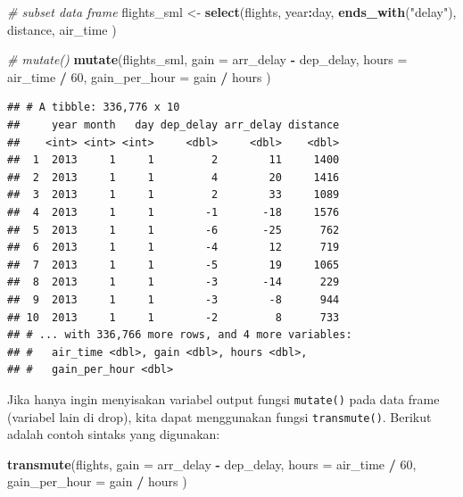 \documentclass[]{book}
\newenvironment{Shaded}{\begin{snugshade}}{\end{snugshade}}
\newcommand{\KeywordTok}[1]{\textcolor[rgb]{0.13,0.29,0.53}{\textbf{#1}}}
\newcommand{\DataTypeTok}[1]{\textcolor[rgb]{0.13,0.29,0.53}{#1}}
\newcommand{\DecValTok}[1]{\textcolor[rgb]{0.00,0.00,0.81}{#1}}
\newcommand{\StringTok}[1]{\textcolor[rgb]{0.31,0.60,0.02}{#1}}
\newcommand{\CommentTok}[1]{\textcolor[rgb]{0.56,0.35,0.01}{\textit{#1}}}
\newcommand{\OperatorTok}[1]{\textcolor[rgb]{0.81,0.36,0.00}{\textbf{#1}}}
\newcommand{\NormalTok}[1]{#1}
\begin{document}
\begin{Shaded}
\begin{Highlighting}[]
\CommentTok{# subset data frame}
\NormalTok{flights_sml <-}\StringTok{ }\KeywordTok{select}\NormalTok{(flights,}
\NormalTok{  year}\OperatorTok{:}\NormalTok{day,}
  \KeywordTok{ends_with}\NormalTok{(}\StringTok{"delay"}\NormalTok{),}
\NormalTok{  distance,}
\NormalTok{  air_time}
\NormalTok{)}

\CommentTok{# mutate()}
\KeywordTok{mutate}\NormalTok{(flights_sml,}
  \DataTypeTok{gain =}\NormalTok{ arr_delay }\OperatorTok{-}\StringTok{ }\NormalTok{dep_delay,}
  \DataTypeTok{hours =}\NormalTok{ air_time }\OperatorTok{/}\StringTok{ }\DecValTok{60}\NormalTok{,}
  \DataTypeTok{gain_per_hour =}\NormalTok{ gain }\OperatorTok{/}\StringTok{ }\NormalTok{hours}
\NormalTok{)}
\end{Highlighting}
\end{Shaded}

\begin{verbatim}
## # A tibble: 336,776 x 10
##     year month   day dep_delay arr_delay distance
##    <int> <int> <int>     <dbl>     <dbl>    <dbl>
##  1  2013     1     1         2        11     1400
##  2  2013     1     1         4        20     1416
##  3  2013     1     1         2        33     1089
##  4  2013     1     1        -1       -18     1576
##  5  2013     1     1        -6       -25      762
##  6  2013     1     1        -4        12      719
##  7  2013     1     1        -5        19     1065
##  8  2013     1     1        -3       -14      229
##  9  2013     1     1        -3        -8      944
## 10  2013     1     1        -2         8      733
## # ... with 336,766 more rows, and 4 more variables:
## #   air_time <dbl>, gain <dbl>, hours <dbl>,
## #   gain_per_hour <dbl>
\end{verbatim}

Jika hanya ingin menyisakan variabel output fungsi \texttt{mutate()}
pada data frame (variabel lain di drop), kita dapat menggunakan fungsi
\texttt{transmute()}. Berikut adalah contoh sintaks yang digunakan:

\begin{Shaded}
\begin{Highlighting}[]
\KeywordTok{transmute}\NormalTok{(flights,}
  \DataTypeTok{gain =}\NormalTok{ arr_delay }\OperatorTok{-}\StringTok{ }\NormalTok{dep_delay,}
  \DataTypeTok{hours =}\NormalTok{ air_time }\OperatorTok{/}\StringTok{ }\DecValTok{60}\NormalTok{,}
  \DataTypeTok{gain_per_hour =}\NormalTok{ gain }\OperatorTok{/}\StringTok{ }\NormalTok{hours}
\NormalTok{)}
\end{Highlighting}
\end{Shaded}
\end{document}
